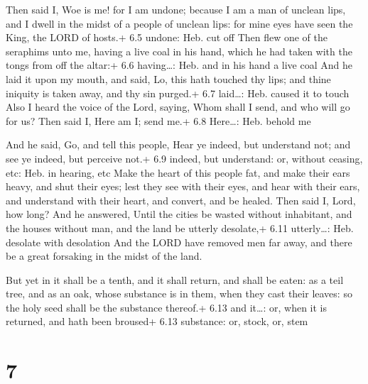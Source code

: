 Then said I, Woe is me! for I am undone; because I am a
man of unclean lips, and I dwell in the midst of a people of unclean
lips: for mine eyes have seen the King, the LORD of hosts.+ 6.5 undone:
Heb. cut off  Then flew one of the seraphims unto me, having
a live coal in his hand, which he had taken with the tongs from off the
altar:+ 6.6 having\ldots: Heb. and in his hand a live coal 
And he laid it upon my mouth, and said, Lo, this hath touched thy lips;
and thine iniquity is taken away, and thy sin purged.+ 6.7 laid\ldots:
Heb. caused it to touch  Also I heard the voice of the Lord,
saying, Whom shall I send, and who will go for us? Then said I, Here am
I; send me.+ 6.8 Here\ldots: Heb. behold me

 And he said, Go, and tell this people, Hear ye indeed,
but understand not; and see ye indeed, but perceive not.+ 6.9 indeed,
but understand: or, without ceasing, etc: Heb. in hearing, etc
 Make the heart of this people fat, and make their ears
heavy, and shut their eyes; lest they see with their eyes, and hear with
their ears, and understand with their heart, and convert, and be healed.
 Then said I, Lord, how long? And he answered, Until the
cities be wasted without inhabitant, and the houses without man, and the
land be utterly desolate,+ 6.11 utterly\ldots: Heb. desolate with
desolation  And the LORD have removed men far away, and
there be a great forsaking in the midst of the land.

 But yet in it shall be a tenth, and it shall return, and
shall be eaten: as a teil tree, and as an oak, whose substance is in
them, when they cast their leaves: so the holy seed shall be the
substance thereof.+ 6.13 and it\ldots: or, when it is returned, and hath
been broused+ 6.13 substance: or, stock, or, stem

\hypertarget{section-6}{%
\section{7}\label{section-6}}

